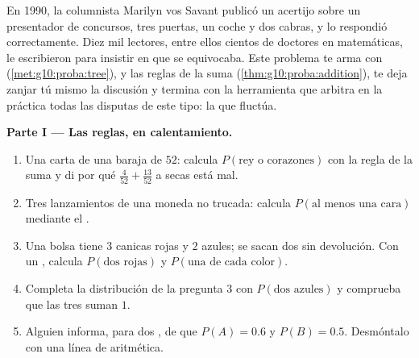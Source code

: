 \begin{problem}
\label{pb:g10:proba:1}
En 1990, la columnista Marilyn vos Savant publicó un acertijo sobre un
presentador de concursos, tres puertas, un coche y dos cabras, y lo
respondió correctamente. Diez mil lectores, entre ellos cientos de
doctores en matemáticas, le escribieron para insistir en que se
equivocaba. Este problema te arma con 
(\cref{met:g10:proba:tree}),  y las reglas de la suma
(\cref{thm:g10:proba:addition}), te deja zanjar tú mismo la discusión y
termina con la herramienta que arbitra en la práctica todas las disputas
de este tipo: la  que fluctúa.

\medskip
\noindent\textbf{Parte I --- Las reglas, en calentamiento.}
\begin{enumerate}
  \item Una carta de una baraja de $52$: calcula
        $P(\text{rey o corazones})$ con la regla de la suma y di por qué
        $\frac{4}{52} + \frac{13}{52}$ a secas está mal.
  \item Tres lanzamientos de una moneda no trucada: calcula
        $P(\text{al menos una cara})$ mediante el .
  \item Una bolsa tiene $3$ canicas rojas y $2$ azules; se sacan dos sin
        devolución. Con un , calcula $P(\text{dos rojas})$ y
        $P(\text{una de cada color})$.
  \item Completa la distribución de la pregunta 3 con
        $P(\text{dos azules})$ y comprueba que las tres 
        suman $1$.
  \item Alguien informa, para dos  \emph{}, de que
        $P(A) = 0.6$ y $P(B) = 0.5$. Desmóntalo con una línea de
        aritmética.
\end{enumerate}


\end{problem}
